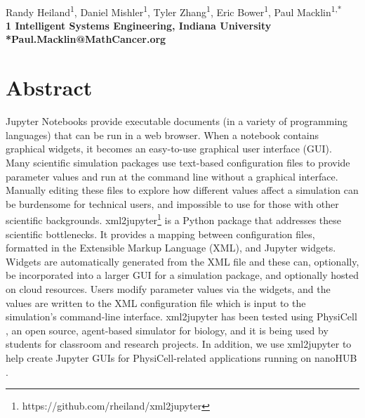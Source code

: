 \documentclass[10pt,letterpaper]{article}
\begin{document}
\vspace*{0.35in}

\begin{flushleft}
{\Large
\textbf{}
}
\newline
\\
Randy Heiland\textsuperscript{1},
Daniel Mishler\textsuperscript{1},
Tyler Zhang\textsuperscript{1},
Eric Bower\textsuperscript{1},
Paul Macklin\textsuperscript{1,*}
\\
\bigskip
\bf{1} Intelligent Systems Engineering, Indiana University
\bigskip
\\
*Paul.Macklin@MathCancer.org 

\end{flushleft}

\section*{Abstract}
Jupyter Notebooks \cite{Kluyver:2016aa,Nature_2018_Jupyter} provide
executable documents (in a variety of programming languages) that can be
run in a web browser. When a notebook contains graphical widgets, it
becomes an easy-to-use graphical user interface (GUI). Many scientific
simulation packages use text-based configuration files to provide
parameter values and run at the command line without a graphical
interface. Manually editing these files to explore how different values
affect a simulation can be burdensome for technical users, and
impossible to use for those with other scientific backgrounds.
xml2jupyter\footnote{https://github.com/rheiland/xml2jupyter} is a 
Python package that addresses these scientific
bottlenecks. It provides a mapping between configuration files,
formatted in the Extensible Markup Language (XML), and Jupyter widgets.
Widgets are automatically generated from the XML file and these can,
optionally, be incorporated into a larger GUI for a simulation package,
and optionally hosted on cloud resources. Users modify parameter values
via the widgets,
and the values are written to the XML configuration file which is input
to the simulation's command-line interface. xml2jupyter has been tested
using PhysiCell \cite{PhysiCell:2018}, an open source, agent-based
simulator for biology, and it is being used by students for classroom
and research projects. In addition, we use xml2jupyter to help create
Jupyter GUIs for PhysiCell-related applications running on nanoHUB \cite{nanoHUB_2013}.
\end{document}
